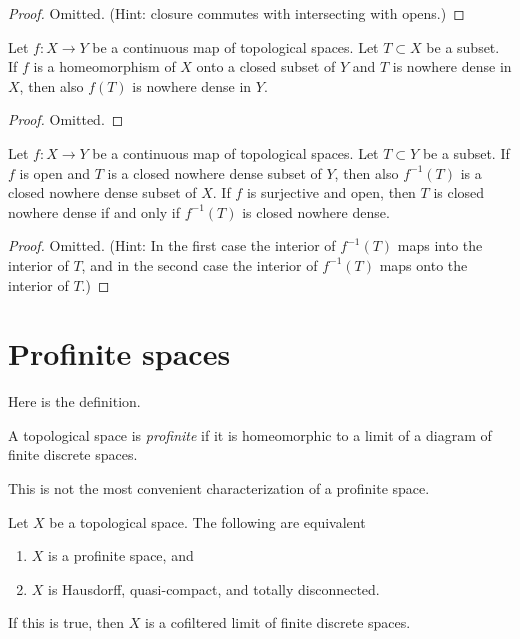 \begin{proof}
Omitted. (Hint: closure commutes with intersecting with opens.)
\end{proof}

\begin{lemma}
\label{lemma-closed-image-nowhere-dense}
Let $f : X \to Y$ be a continuous map of topological spaces.
Let $T \subset X$ be a subset.
If $f$ is a homeomorphism of $X$ onto a closed subset of $Y$
and $T$ is nowhere dense in $X$, then also $f(T)$ is nowhere dense in $Y$.
\end{lemma}

\begin{proof}
Omitted.
\end{proof}

\begin{lemma}
\label{lemma-open-inverse-image-closed-nowhere-dense}
Let $f : X \to Y$ be a continuous map of topological spaces.
Let $T \subset Y$ be a subset.
If $f$ is open and $T$ is a closed nowhere dense subset of $Y$,
then also $f^{-1}(T)$ is a closed nowhere dense subset of $X$.
If $f$ is surjective and open, then
$T$ is closed nowhere dense if and only
if $f^{-1}(T)$ is closed nowhere dense.
\end{lemma}

\begin{proof}
Omitted. (Hint: In the first case the interior of $f^{-1}(T)$
maps into the interior of $T$, and in the second case the interior of
$f^{-1}(T)$ maps onto the interior of $T$.)
\end{proof}






\section{Profinite spaces}
\label{section-profinite}

\noindent
Here is the definition.

\begin{definition}
\label{definition-profinite}
A topological space is {\it profinite} if it is homeomorphic to a limit
of a diagram of finite discrete spaces.
\end{definition}

\noindent
This is not the most convenient characterization of a profinite space.

\begin{lemma}
\label{lemma-profinite}
Let $X$ be a topological space.
The following are equivalent
\begin{enumerate}
\item $X$ is a profinite space, and
\item $X$ is Hausdorff, quasi-compact, and totally disconnected.
\end{enumerate}
If this is true, then $X$ is a cofiltered limit of finite discrete
spaces.
\end{lemma}

